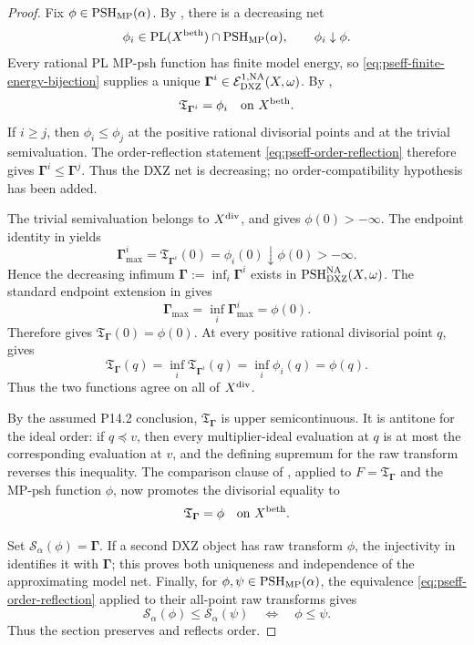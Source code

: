 \begin{proof}
Fix \(\phi\in\operatorname{PSH}_{\mathrm{MP}}(\alpha)\).  By
, there is a decreasing net
\[
 \phi_i\in\operatorname{PL}(X^{\mathrm{beth}})\cap\operatorname{PSH}_{\mathrm{MP}}(\alpha),
 \qquad \phi_i\downarrow\phi.
\]
Every rational PL MP-psh function has finite model energy, so
\eqref{eq:pseff-finite-energy-bijection} supplies a unique
\(\boldsymbol\Gamma^i\in
\mathcal E^{1,\mathrm{NA}}_{\mathrm{DXZ}}(X,\omega)\).  By
,
\[
                 \mathfrak T_{\boldsymbol\Gamma^i}=\phi_i
                 \quad\text{on }X^{\mathrm{beth}}.
\]
If \(i\geq j\), then \(\phi_i\leq\phi_j\) at the positive rational
divisorial points and at the trivial semivaluation.  The order-reflection
statement \eqref{eq:pseff-order-reflection} therefore gives
\(\boldsymbol\Gamma^i\leq\boldsymbol\Gamma^j\).  Thus the DXZ net is
decreasing; no order-compatibility hypothesis has been added.

The trivial semivaluation belongs to \(X^{\mathrm{div}}\), and
 gives \(\phi(0)>-\infty\).  The endpoint
identity in  yields
\[
 \boldsymbol\Gamma^i_{\max}
   =\mathfrak T_{\boldsymbol\Gamma^i}(0)
   =\phi_i(0)\downarrow\phi(0)>-\infty.
\]
Hence the decreasing infimum
\(\boldsymbol\Gamma:=\inf_i\boldsymbol\Gamma^i\) exists in
\(\operatorname{PSH}^{\mathrm{NA}}_{\mathrm{DXZ}}(X,\omega)\).  The standard endpoint extension
in  gives
\[
 \boldsymbol\Gamma_{\max}
   =\inf_i\boldsymbol\Gamma^i_{\max}
   =\phi(0).
\]
Therefore  gives
\(\mathfrak T_{\boldsymbol\Gamma}(0)=\phi(0)\).  At every positive
rational divisorial point \(q\),  gives
\[
 \mathfrak T_{\boldsymbol\Gamma}(q)
   =\inf_i\mathfrak T_{\boldsymbol\Gamma^i}(q)
   =\inf_i\phi_i(q)
   =\phi(q).
\]
Thus the two functions agree on all of \(X^{\mathrm{div}}\).

By the assumed P14.2 conclusion,
\(\mathfrak T_{\boldsymbol\Gamma}\) is upper semicontinuous.  It is
antitone for the ideal order: if \(q\preceq v\), then every multiplier-ideal
evaluation at \(q\) is at most the corresponding evaluation at \(v\), and
the defining supremum for the raw transform reverses this inequality.
The comparison clause of ,
applied to \(F=\mathfrak T_{\boldsymbol\Gamma}\) and the MP-psh function
\(\phi\), now promotes the divisorial equality to
\[
                 \mathfrak T_{\boldsymbol\Gamma}=\phi
                 \quad\text{on }X^{\mathrm{beth}}.
\]

Set \(\mathcal S_\alpha(\phi)=\boldsymbol\Gamma\).  If a second DXZ
object has raw transform \(\phi\), the injectivity in
 identifies it with
\(\boldsymbol\Gamma\); this proves both uniqueness and independence of the
approximating model net.  Finally, for \(\phi,\psi\in
\operatorname{PSH}_{\mathrm{MP}}(\alpha)\), the equivalence
\eqref{eq:pseff-order-reflection} applied to their all-point raw transforms
gives
\[
 \mathcal S_\alpha(\phi)\leq\mathcal S_\alpha(\psi)
 \quad\Longleftrightarrow\quad
 \phi\leq\psi.
\]
Thus the section preserves and reflects order.
\end{proof}
